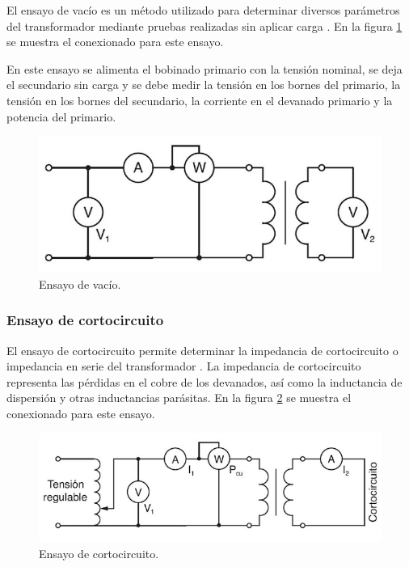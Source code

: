 El ensayo de vacío es un método utilizado para determinar diversos parámetros del transformador mediante pruebas realizadas sin aplicar carga \citep{TRAFO_VACIO}. En la figura \ref{fig:figEnsayoVacio} se muestra el conexionado para este ensayo.

En este ensayo se alimenta el bobinado primario con la tensión nominal, se deja el secundario sin carga y se debe medir la tensión en los bornes del primario, la tensión en los bornes del secundario, la corriente en el devanado primario y la potencia del primario. 

\begin{figure}[htpb]
	\centering
	\includegraphics[scale=.4]{./Figures/EnsayoVacio.png}
	\caption{Ensayo de vacío.}
	\label{fig:figEnsayoVacio}
\end{figure}

\subsubsection{Ensayo de cortocircuito}
El ensayo de cortocircuito permite determinar la impedancia de cortocircuito o impedancia en serie del transformador \citep{TRAFO_CORTO}. La impedancia de cortocircuito representa las pérdidas en el cobre de los devanados, así como la inductancia de dispersión y otras inductancias parásitas. En la figura \ref{fig:figEnsayoCorto} se muestra el conexionado para este ensayo.

\begin{figure}[htpb]
	\centering
	\includegraphics[scale=.5]{./Figures/EnsayoCorto.png}
	\caption{Ensayo de cortocircuito.}
	\label{fig:figEnsayoCorto}
\end{figure}

